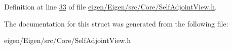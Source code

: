 Definition at line \hyperlink{eigen_2_eigen_2src_2_core_2_self_adjoint_view_8h_source_l00033}{33} of file \hyperlink{eigen_2_eigen_2src_2_core_2_self_adjoint_view_8h_source}{eigen/\+Eigen/src/\+Core/\+Self\+Adjoint\+View.\+h}.



The documentation for this struct was generated from the following file\+:\begin{DoxyCompactItemize}
\item 
eigen/\+Eigen/src/\+Core/\+Self\+Adjoint\+View.\+h\end{DoxyCompactItemize}

